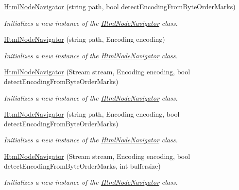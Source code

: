 \begin{DoxyCompactItemize}
\hyperlink{class_html_agility_pack_1_1_html_node_navigator_a4a9fc87feeb9b40279617d0da6a4928f}{Html\+Node\+Navigator} (string path, bool detect\+Encoding\+From\+Byte\+Order\+Marks)
\begin{DoxyCompactList}\small\item\em Initializes a new instance of the \hyperlink{class_html_agility_pack_1_1_html_node_navigator}{Html\+Node\+Navigator} class. \end{DoxyCompactList}\item 
\hyperlink{class_html_agility_pack_1_1_html_node_navigator_ad52432337d1fcab9bd3cd5c869c96414}{Html\+Node\+Navigator} (string path, Encoding encoding)
\begin{DoxyCompactList}\small\item\em Initializes a new instance of the \hyperlink{class_html_agility_pack_1_1_html_node_navigator}{Html\+Node\+Navigator} class. \end{DoxyCompactList}\item 
\hyperlink{class_html_agility_pack_1_1_html_node_navigator_afcb924ba8473a179b378a5de93653e53}{Html\+Node\+Navigator} (Stream stream, Encoding encoding, bool detect\+Encoding\+From\+Byte\+Order\+Marks)
\begin{DoxyCompactList}\small\item\em Initializes a new instance of the \hyperlink{class_html_agility_pack_1_1_html_node_navigator}{Html\+Node\+Navigator} class. \end{DoxyCompactList}\item 
\hyperlink{class_html_agility_pack_1_1_html_node_navigator_a2852fd306ba9ce0fb8f2ce9684501a16}{Html\+Node\+Navigator} (string path, Encoding encoding, bool detect\+Encoding\+From\+Byte\+Order\+Marks)
\begin{DoxyCompactList}\small\item\em Initializes a new instance of the \hyperlink{class_html_agility_pack_1_1_html_node_navigator}{Html\+Node\+Navigator} class. \end{DoxyCompactList}\item 
\hyperlink{class_html_agility_pack_1_1_html_node_navigator_a5cb6a280b7e667e66b65ce6095623c44}{Html\+Node\+Navigator} (Stream stream, Encoding encoding, bool detect\+Encoding\+From\+Byte\+Order\+Marks, int buffersize)
\begin{DoxyCompactList}\small\item\em Initializes a new instance of the \hyperlink{class_html_agility_pack_1_1_html_node_navigator}{Html\+Node\+Navigator} class. \end{DoxyCompactList}\item 

\end{DoxyCompactItemize}
